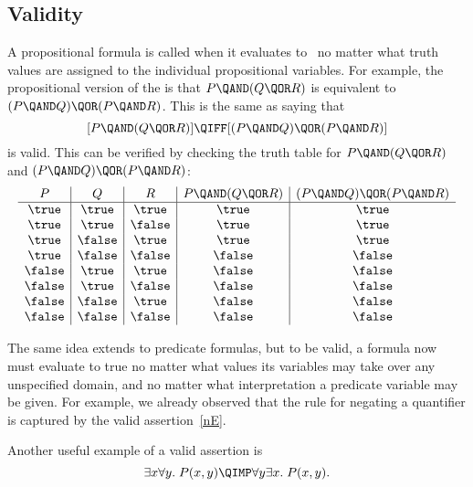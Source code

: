 \begin{editingnoes}
\section{Validity}\label{sec:validity}

A propositional formula is called  when it evaluates to \true\
no matter what truth values are assigned to the individual propositional
variables.  For example, the propositional version of the 
is that $P \QAND (Q \QOR R)$ is equivalent to $(P \QAND Q) \QOR (P \QAND
R)$.  This is the same as saying that
\begin{equation}\label{eq:distributive_law}
[P \QAND (Q \QOR R)] \QIFF [(P \QAND Q) \QOR (P \QAND R)]
\end{equation}
is valid.  This can be verified by checking the truth table for $P
\QAND (Q \QOR R)$ and $(P \QAND Q) \QOR (P \QAND R)$:
\begin{equation*}
\begin{array}{c|c|c|c|c}

P & Q & R & P \QAND (Q \QOR R) & (P \QAND Q) \QOR (P \QAND R) \\
\hline

\true & \true  & \true   & \true  & \true \\
\true & \true  & \false  & \true  & \true \\
\true & \false & \true   & \true  & \true \\
\true & \false & \false  & \false & \false \\

\false & \true  & \true  & \false & \false \\
\false & \true  & \false & \false & \false \\
\false & \false & \true  & \false & \false \\
\false & \false & \false & \false & \false

\end{array}
\end{equation*}

The same idea extends to predicate formulas, but to be valid, a
formula now must evaluate to true no matter what values its variables
may take over any unspecified domain, and no matter what
interpretation a predicate variable may be given.  For example, we
already observed that the rule for negating a quantifier is captured
by the valid assertion~\eqref{nE}.

Another useful example of a valid assertion is
\begin{equation}\label{eaimpliesae}
\exists x \forall y.\; P(x,y) \QIMP \forall y \exists x.\; P(x,y).
\end{equation}


\end{editingnoes}
